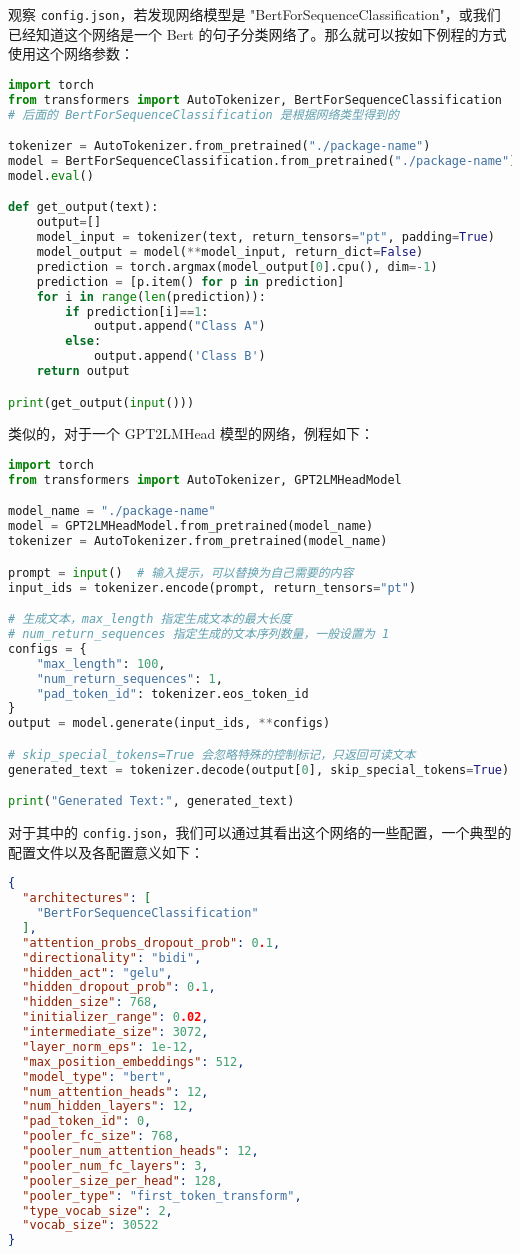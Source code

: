 观察 \verb`config.json`，若发现网络模型是 "BertForSequenceClassification"，或我们已经知道这个网络是一个 Bert 的句子分类网络了。那么就可以按如下例程的方式使用这个网络参数：
\begin{lstlisting}[language=python]
import torch
from transformers import AutoTokenizer, BertForSequenceClassification 
# 后面的 BertForSequenceClassification 是根据网络类型得到的

tokenizer = AutoTokenizer.from_pretrained("./package-name")
model = BertForSequenceClassification.from_pretrained("./package-name")
model.eval()

def get_output(text):
    output=[]
    model_input = tokenizer(text, return_tensors="pt", padding=True)
    model_output = model(**model_input, return_dict=False)
    prediction = torch.argmax(model_output[0].cpu(), dim=-1)
    prediction = [p.item() for p in prediction]
    for i in range(len(prediction)):
        if prediction[i]==1:
            output.append("Class A")
        else:
            output.append('Class B')
    return output

print(get_output(input()))
\end{lstlisting}

类似的，对于一个 GPT2LMHead 模型的网络，例程如下：
\begin{lstlisting}[language=python]
import torch
from transformers import AutoTokenizer, GPT2LMHeadModel

model_name = "./package-name"
model = GPT2LMHeadModel.from_pretrained(model_name)
tokenizer = AutoTokenizer.from_pretrained(model_name)

prompt = input()  # 输入提示，可以替换为自己需要的内容
input_ids = tokenizer.encode(prompt, return_tensors="pt")

# 生成文本，max_length 指定生成文本的最大长度
# num_return_sequences 指定生成的文本序列数量，一般设置为 1
configs = {
    "max_length": 100,
    "num_return_sequences": 1,
    "pad_token_id": tokenizer.eos_token_id
}
output = model.generate(input_ids, **configs)

# skip_special_tokens=True 会忽略特殊的控制标记，只返回可读文本
generated_text = tokenizer.decode(output[0], skip_special_tokens=True)

print("Generated Text:", generated_text)
\end{lstlisting}

对于其中的 \verb`config.json`，我们可以通过其看出这个网络的一些配置，一个典型的配置文件以及各配置意义如下：
\begin{lstlisting}[language=json]
{
  "architectures": [
    "BertForSequenceClassification"
  ],
  "attention_probs_dropout_prob": 0.1,
  "directionality": "bidi",
  "hidden_act": "gelu",
  "hidden_dropout_prob": 0.1,
  "hidden_size": 768,
  "initializer_range": 0.02,
  "intermediate_size": 3072,
  "layer_norm_eps": 1e-12,
  "max_position_embeddings": 512,
  "model_type": "bert",
  "num_attention_heads": 12,
  "num_hidden_layers": 12,
  "pad_token_id": 0,
  "pooler_fc_size": 768,
  "pooler_num_attention_heads": 12,
  "pooler_num_fc_layers": 3,
  "pooler_size_per_head": 128,
  "pooler_type": "first_token_transform",
  "type_vocab_size": 2,
  "vocab_size": 30522
}
\end{lstlisting}

